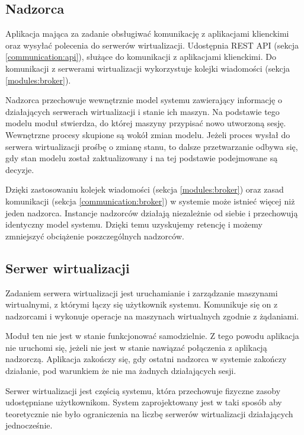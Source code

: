 \documentclass[../opis-rozwiazania.tex]{subfiles}
\begin{document}
\subsection{Nadzorca}
\label{modules:overseer}

Aplikacja mająca za zadanie obsługiwać komunikację z aplikacjami klienckimi oraz wysyłać polecenia do serwerów wirtualizacji. Udostępnia REST API (sekcja \ref{communication:api}), służące do komunikacji z aplikacjami klienckimi. Do komunikacji z serwerami wirtualizacji wykorzystuje kolejki wiadomości (sekcja \ref{modules:broker}).

Nadzorca przechowuje wewnętrznie model systemu zawierający informację o działających serwerach wirtualizacji i stanie ich maszyn. Na podstawie tego modelu moduł stwierdza, do której maszyny przypisać nowo utworzoną sesję. Wewnętrzne procesy skupione są wokół zmian modelu. Jeżeli proces wysłał do serwera wirtualizacji prośbę o zmianę stanu, to dalsze przetwarzanie odbywa się, gdy stan modelu został zaktualizowany i na tej podstawie podejmowane są decyzje.

Dzięki zastosowaniu kolejek wiadomości (sekcja \ref{modules:broker}) oraz zasad komunikacji (sekcja \ref{communication:broker}) w systemie może istnieć więcej niż jeden nadzorca. Instancje nadzorców działają niezależnie od siebie i przechowują identyczny model systemu. Dzięki temu uzyskujemy retencję i możemy zmniejszyć obciążenie poszczególnych nadzorców.

\subsection{Serwer wirtualizacji}
\label{modules:virtsrv}

Zadaniem serwera wirtualizacji jest uruchamianie i zarządzanie maszynami wirtualnymi, z którymi łączy się użytkownik systemu. Komunikuje się on z nadzorcami i wykonuje operacje na maszynach wirtualnych zgodnie z żądaniami.

Moduł ten nie jest w stanie funkcjonować samodzielnie. Z tego powodu aplikacja nie uruchomi się, jeżeli nie jest w stanie nawiązać połączenia z aplikacją nadzorczą. Aplikacja zakończy się, gdy ostatni nadzorca w systemie zakończy działanie, pod warunkiem że nie ma żadnych działających sesji.

Serwer wirtualizacji jest częścią systemu, która przechowuje fizyczne zasoby udostępniane użytkownikom.
System zaprojektowany jest w taki sposób aby teoretycznie nie było ograniczenia na liczbę serwerów wirtualizacji działających jednocześnie.
\end{document}
